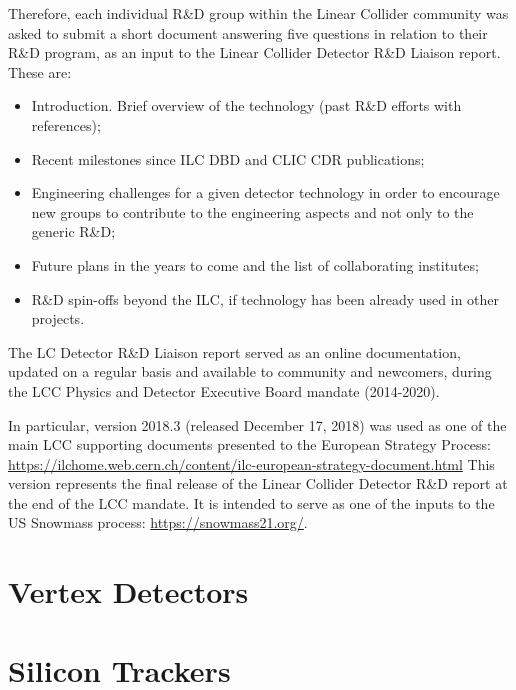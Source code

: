 \documentclass[10pt,final]{report}
\begin{document}
Therefore, each individual R\&D group within the Linear Collider community was asked to
submit a short document answering five questions in relation to their R\&D program, as an
input to the Linear Collider Detector R\&D Liaison report. These are:
\begin{itemize}
	\item Introduction. Brief overview of the technology (past R\&D efforts with references);
	\item Recent milestones since ILC DBD and CLIC CDR publications;
	\item Engineering challenges for a given detector technology in order to encourage new
groups to contribute to the engineering aspects and not only to the generic R\&D;
	\item Future plans in the years to come and the list of collaborating institutes;
	\item R\&D spin-offs beyond the ILC, if technology has been already used in other projects.
\end{itemize}
The LC Detector R\&D Liaison report served as an online documentation, updated on a
regular basis and available to community and newcomers, during the LCC Physics and
Detector Executive Board mandate (2014-2020).

In particular, version 2018.3 (released December 17, 2018) was used as one of the main
LCC supporting documents presented to the European Strategy Process:
\url{https://ilchome.web.cern.ch/content/ilc-european-strategy-document.html}
This version represents the final release of the Linear Collider Detector R\&D report at the
end of the LCC mandate. It is intended to serve as one of the inputs to the US Snowmass
process: \url{https://snowmass21.org/}.

\chapter{Vertex Detectors}








\newpage

% 
\newpage
\chapter{Silicon Trackers}





\end{document}
